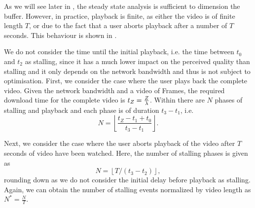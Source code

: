 As we will see later in , the steady state analysis is sufficient to dimension the buffer. 
However, in practice, playback is finite, as either the video is of finite length \(T\), or due to the fact that a user aborts playback after a number of \(T\) seconds.
This behaviour is shown in .

We do not consider the time until the initial playback, i.e. the time between \(t_0\) and \(t_2\) as stalling, since it has a much lower impact on the perceived quality than stalling \cite{Garcia2014} and it only depends on the network bandwidth \networkBandwidth and thus is not subject to optimisation.
First, we consider the case where the user plays back the complete video.
Given the network bandwidth \networkBandwidth and a video of \numberFrames Frames, the required download time for the complete video is \(t_Z = \frac{Z}{\lambda}\).
Within \videoDownloadTime there are \(N\) phases of stalling and playback and each phase is of duration \(t_3 - t_1\), i.e.
\[
N = \left\lfloor \frac{t_Z-t_1+t_0}{t_3-t_1} \right\rfloor .
\]

Next, we consider the case where the user aborts playback of the video after \(T\) seconds of video have been watched.
Here, the number of stalling phases is given as 
\[
N = \left \lfloor{T / (t_3 - t_2)}\right \rfloor,
\]
rounding down as we do not consider the initial delay before playback as stalling.
Again, we can obtain the number of stalling events normalized by video length as
\(N^*=\frac{N}{T}\).